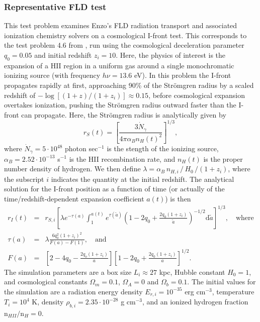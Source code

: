 \subsubsection{Representative FLD test}
\label{sec.tests.fld}

This test problem examines Enzo's FLD radiation transport and
associated ionization chemistry solvers on a cosmological I-front
test.  This corresponds to the test problem 4.6
from \cite{ReynoldsHayesPaschosNorman2009}, run using the cosmological
deceleration parameter $q_0 = 0.05$ and initial redshift $z_i=10$.
Here, the physics of interest is the expansion of a HII region in a
uniform gas around a single monochromatic ionizing source (with
frequency $h\nu = 13.6$ eV).  In this problem the I-front propagates
rapidly at first, approaching 90\% of the Str{\" o}mgren radius by a
scaled redshift of $-\log\left[(1+z)/(1+z_i)\right] \approx 0.15$,
before cosmological expansion overtakes ionization, pushing the Str{\"
o}mgren radius outward faster than the I-front can propagate.  Here,
the Str{\" o}mgren radius is analytically given by
\[
   r_S(t) = \left[\frac{3\dot{N}_{\gamma}}{4\pi \alpha_B
   n_H(t)^2}\right]^{1/3}, 
\]
where $\dot{N}_{\gamma} = 5\cdot10^{48}$ photon sec$^{-1}$ is the
stength of the ionizing source, $\alpha_B = 2.52\cdot10^{-13}$
s$^{-1}$ is the HII recombination rate, and $n_H(t)$ is the proper
number density of hydrogen.  We then define $\lambda = \alpha_B\,
n_{H,i}\, /\, H_0\, / (1+z_i)$, where the subscript $i$ indicates the
quantity at the initial redshift.  The analytical solution for the
I-front position as a function of time (or actually of the
time/redshift-dependent expansion coefficient $a(t)$) is then
\begin{eqnarray*}
   r_I(t) &=& r_{S,i} \left[\lambda e^{-\tau(a)} \int_1^{a(t)}
     e^{\tau(\tilde a)} \left(1 - 2q_0
     + \frac{2q_0(1+z_i)}{\tilde{a}}\right)^{-1/2}\mathrm
     d\tilde{a}\right]^{1/3}, \quad\text{where} \\ 
   \tau(a) &=& \lambda\frac{6q_0^2(1+z_i)^2}{F(a)-F(1)}, 
     \quad\text{and} \\
   F(a) &=& \left[2-4q_0 - \frac{2q_o(1+z_i)}{a}\right] 
      \left[1-2q_0 + \frac{2q_0(1+z_i)}{a}\right]^{1/2}.
\end{eqnarray*}
The simulation parameters are a box size $L_i\approx 27$ kpc, Hubble
constant $H_0 = 1$, and cosmological constants $\Omega_m = 0.1$,
$\Omega_A=0$ and $\Omega_b = 0.1$.  The initial values for the
simulation are a radiation energy density $E_{r,i} = 10^{-35}$ erg
cm$^{-3}$, temperature $T_i = 10^4$ K, density $\rho_{b,i} =
2.35\cdot10^{-28}$ g cm$^{-3}$, and an ionized hydrogen fraction
${\mathrm n}_{HII}/{\mathrm n}_H = 0$.

